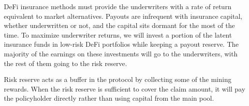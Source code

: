 DeFi insurance methods must provide the underwriters with a rate of return equivalent to market alternatives.
Payouts are infrequent with insurance capital, whether underwritten or not, and the capital sits dormant for the most of the time.
To maximize underwriter returns, we will invest a portion of the latent insurance funds in low-risk DeFi portfolios while keeping a payout reserve.
The majority of the earnings on these investments will go to the underwriters, with the rest of them going to the risk reserve.

Risk reserve acts as a buffer in the protocol by collecting some of the mining rewards.
When the risk reserve is sufficient to cover the claim amount, it will pay the policyholder directly rather than using capital from the main pool.
